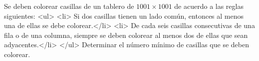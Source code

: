 Se deben colorear casillas de un tablero de $1001 \times 1001$ de acuerdo a las reglas siguientes:
<ul>
  <li> Si dos casillas tienen un lado común, entonces al menos una de ellas se debe colorear.</li>
  <li> De cada seis casillas consecutivas de una fila o de una columna, siempre se deben colorear al menos dos de ellas que sean adyacentes.</li>
</ul>
Determinar el número mínimo de casillas que se deben colorear.
